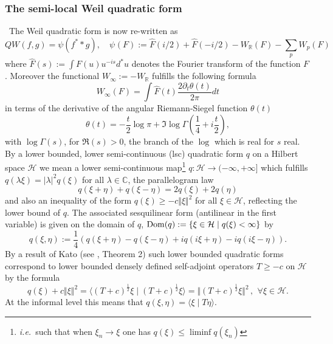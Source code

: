 \documentclass[cupthm]{CUP-JNL-JMJ}
\def\C{{\mathbb C}}
\def\R{{\mathbb R}}
\def\cH{{\mathcal H}}
\def\qqq{\,,\,~\forall}
\newcommand{\ie}{{\it i.e.\/}\ }
\numberwithin{equation}{section}
\theoremstyle{cupplain}
\theoremstyle{cupdefinition}
\theoremstyle{cupremark}
\theoremstyle{cupproof}
\begin{document}
 \subsubsection{The semi-local Weil quadratic form}
~The Weil quadratic form is now re-written as 
\begin{equation}\label{bombtest}
QW(f,g)=\psi(f^**g), \quad\psi_{}(F):={\widehat F}(i/2)+{\widehat F}(-i/2)- W_\R(F)-\sum_{p} W_p(F)
 \end{equation}
 where ${\widehat F}(s):=\int F(u)u^{-is}d^*u$ denotes the Fourier transform of the function $F$. Moreover the functional $W_\infty:=- W_\R$ fulfills the following formula 
 \begin{equation}\label{thetaprime}
 W_\infty(F)=\int 
{\widehat F}(t)\frac{2\partial_t\theta(t)}{2 \pi}dt
\end{equation}
in terms of the derivative of the angular Riemann-Siegel function $\theta(t)$
 \begin{equation}\label{riesie}
\theta(t) = - \frac{t}{2} \log \pi + \Im \log \Gamma \left(
\frac{1}{4} + i \frac{t}{2} \right),
\end{equation}
with $\log \Gamma(s)$, for $\Re (s)>0$, the branch of the $\log$
which is real for $s$ real. \newline
By a lower bounded, lower semi-continuous  (lsc) quadratic form $q$ on a Hilbert space $\cH$ we mean a lower semi-continuous map\footnote{\ie such that when $\xi_n\to \xi$ one has $q(\xi)\leq \liminf q(\xi_n)$} $q:\cH\to (-\infty,+\infty]$ which fulfills $q(\lambda \xi)=\vert \lambda\vert^2 q(\xi)$ for all $\lambda \in \C$,  the parallelogram law 
$$
q(\xi + \eta) +q(\xi-\eta)=2 q(\xi) +2 q(\eta)
$$
and also  an inequality of the form $q(\xi)\geq -c \Vert \xi\Vert^2$ for all $\xi \in \cH$,  reflecting the lower bound of $q$.
  The associated sesquilinear form (antilinear in the first variable) is given on the domain of $q$, 
  $
  {\rm Dom}(q):=\{\xi \in \cH\mid q(\xi)<\infty\}
  $  by 
  $$
  q(\xi,\eta):=\frac 14\left( q(\xi + \eta) -q(\xi-\eta)+iq(i\xi + \eta) -iq(i\xi-\eta)\right).
  $$
  By a result of Kato (see \cite{Simon}, Theorem 2) such lower bounded quadratic forms correspond to lower bounded densely defined self-adjoint operators $T\geq -c$ on $\cH$ by the formula 
  $$
  q(\xi )+c\Vert \xi\Vert^2= \langle (T+c)^{\frac 12}\xi\mid (T+c)^{\frac 12}\xi\rangle=
  \Vert (T+c)^{\frac 12}\xi\Vert^2 \qqq \xi \in \cH.
  $$
  At the informal level this means  that $q(\xi,\eta )=\langle \xi\mid T\eta\rangle$.
\end{document}
